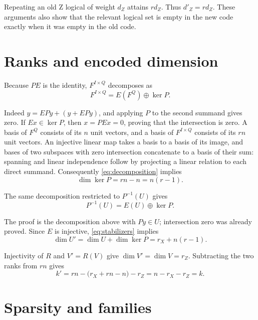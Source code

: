 \documentclass{article}
\begin{document}
Repeating an old Z logical of weight \(d_Z\) attains \(r d_Z\). Thus
\(d'_Z=r d_Z\). These arguments also show that the relevant logical set
is empty in the new code exactly when it was empty in the old code.

\section{Ranks and encoded dimension}\label{sec:ranks}

Because \(PE\) is the identity, \(F^{I\times Q}\) decomposes as
\begin{equation}\label{eq:decomposition}
F^{I\times Q}=E(F^Q)\mathbin{\oplus}\ker P.
\end{equation}

Indeed \(y=EPy+(y+EPy)\), and applying \(P\) to the second summand gives
zero. If \(Ex\in\ker P\), then \(x=PEx=0\), proving that the intersection
is zero. A basis of \(F^Q\) consists of its \(n\) unit vectors, and a
basis of \(F^{I\times Q}\) consists of its \(rn\) unit vectors. An
injective linear map takes a basis to a basis of its image, and bases
of two subspaces with zero intersection concatenate to a basis of
their sum: spanning and linear independence follow by projecting a
linear relation to each direct summand. Consequently \eqref{eq:decomposition} implies
\begin{equation}\label{eq:kernel-dimension}
\dim\ker P=rn-n=n(r-1).
\end{equation}

The same decomposition restricted to \(P^{-1}(U)\) gives
\begin{equation}\label{eq:restricted-decomposition}
P^{-1}(U)=E(U)\mathbin{\oplus}\ker P.
\end{equation}

The proof is the decomposition above with \(Py\in U\); intersection
zero was already proved. Since \(E\) is injective, \eqref{eq:stabilizers} implies
\begin{equation}\label{eq:x-rank}
\dim U'=\dim U+\dim\ker P=r_X+n(r-1).
\end{equation}

Injectivity of \(R\) and \(V'=R(V)\) give \(\dim V'=\dim V=r_Z\).
Subtracting the two ranks from \(rn\) gives
\begin{equation}\label{eq:encoded-dimension}
k'=rn-\bigl(r_X+rn-n\bigr)-r_Z=n-r_X-r_Z=k.
\end{equation}

\section{Sparsity and families}\label{sec:sparsity}
\end{document}
